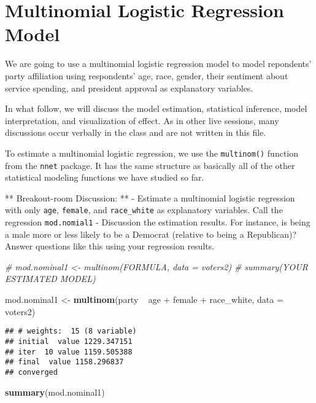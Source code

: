 \documentclass[]{article}
\newenvironment{Shaded}{\begin{snugshade}}{\end{snugshade}}
\newcommand{\KeywordTok}[1]{\textcolor[rgb]{0.13,0.29,0.53}{\textbf{{#1}}}}
\newcommand{\DataTypeTok}[1]{\textcolor[rgb]{0.13,0.29,0.53}{{#1}}}
\newcommand{\StringTok}[1]{\textcolor[rgb]{0.31,0.60,0.02}{{#1}}}
\newcommand{\CommentTok}[1]{\textcolor[rgb]{0.56,0.35,0.01}{\textit{{#1}}}}
\newcommand{\NormalTok}[1]{{#1}}
\begin{document}
\section{Multinomial Logistic Regression
Model}\label{multinomial-logistic-regression-model}

We are going to use a multinomial logistic regression model to model
repondents' party affiliation using respondents' age, race, gender,
their sentiment about service spending, and president approval as
explanatory variables.

In what follow, we will discuss the model estimation, statistical
inference, model interpretation, and visualization of effect. As in
other live sessions, many discussions occur verbally in the class and
are not written in this file.

To estimate a multinomial logistic regression, we use the
\texttt{multinom()} function from the \texttt{nnet} package. It has the
same structure as basically all of the other statistical modeling
functions we have studied so far.

** Breakout-room Discussion: ** - Estimate a multinomial logistic
regression with only \texttt{age}, \texttt{female}, and
\texttt{race\_white} as explanatory variables. Call the regression
\texttt{mod.nomial1} - Discussion the estimation results. For instance,
is being a male more or less likely to be a Democrat (relative to being
a Republican)? Answer questions like this using your regression results.

\begin{Shaded}
\begin{Highlighting}[]
\CommentTok{# mod.nominal1 <- multinom(FORMULA, data = voters2)}
\CommentTok{# summary(YOUR ESTIMATED MODEL)}

\NormalTok{mod.nominal1 <-}\StringTok{ }\KeywordTok{multinom}\NormalTok{(party ~}\StringTok{ }\NormalTok{age +}\StringTok{ }\NormalTok{female +}\StringTok{ }\NormalTok{race_white, }\DataTypeTok{data =} \NormalTok{voters2)}
\end{Highlighting}
\end{Shaded}

\begin{verbatim}
## # weights:  15 (8 variable)
## initial  value 1229.347151 
## iter  10 value 1159.505388
## final  value 1158.296837 
## converged
\end{verbatim}

\begin{Shaded}
\begin{Highlighting}[]
\KeywordTok{summary}\NormalTok{(mod.nominal1)}
\end{Highlighting}
\end{Shaded}
\end{document}
